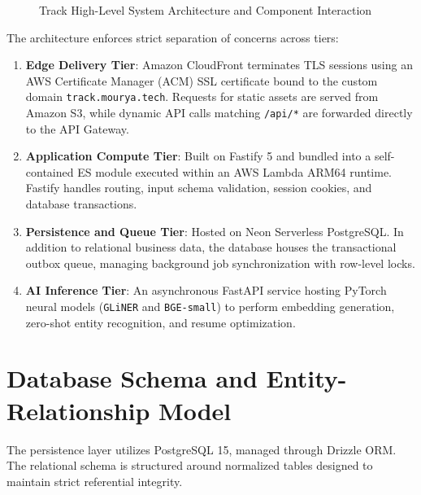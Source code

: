 \begin{figure}[htbp]
\caption{Track High-Level System Architecture and Component Interaction}
\label{fig:high_level_arch}
\end{figure}

The architecture enforces strict separation of concerns across tiers:
\begin{enumerate}
    \item \textbf{Edge Delivery Tier}: Amazon CloudFront terminates TLS sessions using an AWS Certificate Manager (ACM) SSL certificate bound to the custom domain \texttt{track.mourya.tech}. Requests for static assets are served from Amazon S3, while dynamic API calls matching \texttt{/api/*} are forwarded directly to the API Gateway.
    \item \textbf{Application Compute Tier}: Built on Fastify 5 and bundled into a self-contained ES module executed within an AWS Lambda ARM64 runtime. Fastify handles routing, input schema validation, session cookies, and database transactions.
    \item \textbf{Persistence and Queue Tier}: Hosted on Neon Serverless PostgreSQL. In addition to relational business data, the database houses the transactional outbox queue, managing background job synchronization with row-level locks.
    \item \textbf{AI Inference Tier}: An asynchronous FastAPI service hosting PyTorch neural models (\texttt{GLiNER} and \texttt{BGE-small}) to perform embedding generation, zero-shot entity recognition, and resume optimization.
\end{enumerate}

\section{Database Schema and Entity-Relationship Model}
The persistence layer utilizes PostgreSQL 15, managed through Drizzle ORM. The relational schema is structured around normalized tables designed to maintain strict referential integrity.

